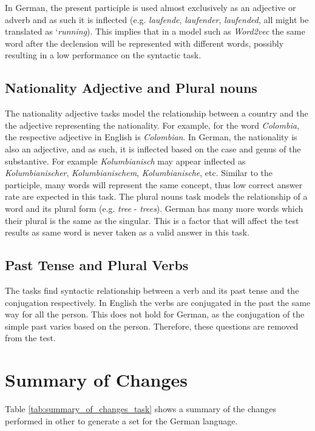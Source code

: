 In German, the present participle is used almost exclusively as an
adjective or adverb and as such it is inflected (e.g. \textit{laufende},
\textit{laufender}, \textit{laufended}, all might be translated as
`\textit{running}). This implies that in a model
such as  \textit{Word2vec} the same word after the declension will be
represented with different words, possibly resulting in a low performance on
the syntactic task. 


\subsection{Nationality Adjective and  Plural nouns}
\label{sec:sub_sec_nat_plu}

The nationality adjective tasks model the relationship between a country and
the the adjective representing the nationality. For example, for the word
\textit{Colombia}, the respective adjective in English is \textit{Colombian}. In German,
the nationality is also an adjective, and as such, it  is inflected based on the
case and genus of the substantive.  For example  \textit{Kolumbianisch} may appear 
inflected as \textit{Kolumbianischer},  \textit{Kolumbianischem},
\textit{Kolumbianische}, etc.  Similar to the participle, many words will
represent the same concept, thus low correct answer rate are expected in this
task.  
The plural nouns task models the relationship of a word and its plural form
(e.g. \textit{tree} - \textit{trees}).
German has many more words which their plural is the same as the singular. 
This is a factor that will affect the test results  as same word is never taken as a
valid answer in this task.


\subsection{Past Tense and Plural Verbs}
\label{sec:sub_sec_plural_verbs}
The  tasks find syntactic relationship between a verb and its past tense
and the conjugation respectively. In English the verbs are conjugated in the
past the same way for all the person. This does not hold for German, as the
conjugation of the simple past varies based on the person. Therefore, these questions are removed from the test.

\section{Summary of Changes} 
Table \ref{tab:summary_of_changes_task} shows a summary of the changes
performed in other to generate a set for the German language.

